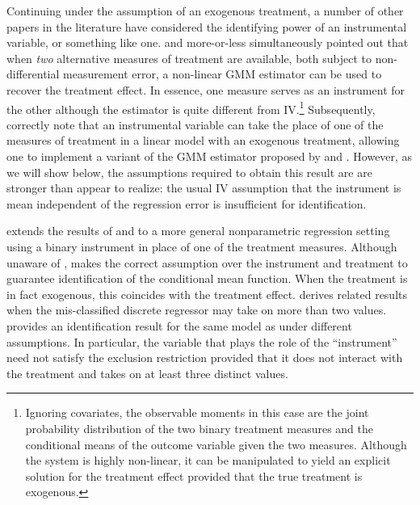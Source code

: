 Continuing under the assumption of an exogenous treatment, a number of other papers in the literature have considered the identifying power of an instrumental variable, or something like one.
\cite{BBS} and \cite{KRS} more-or-less simultaneously pointed out that when \emph{two} alternative measures of treatment are available, both subject to non-differential measurement error, a non-linear GMM estimator can be used to recover the treatment effect.
In essence, one measure serves as an instrument for the other although the estimator is quite different from IV.\footnote{Ignoring covariates, the observable moments in this case are the joint probability distribution of the two binary treatment measures and the conditional means of the outcome variable given the two measures. Although the system is highly non-linear, it can be manipulated to yield an explicit solution for the treatment effect provided that the true treatment is exogenous.}
Subsequently, \cite{FL} correctly note that an instrumental variable can take the place of one of the measures of treatment in a linear model with an exogenous treatment, allowing one to implement a variant of the GMM estimator proposed by \cite{BBS} and \cite{KRS}.
However, as we will show below, the assumptions required to obtain this result are are stronger than \cite{FL} appear to realize: the usual IV assumption that the instrument is mean independent of the regression error is insufficient for identification. 

\cite{Mahajan} extends the results of \cite{BBS} and \cite{KRS} to a more general nonparametric regression setting using a binary instrument in place of one of the treatment measures. 
Although unaware of \cite{FL}, \cite{Mahajan} makes the correct assumption over the instrument and treatment to guarantee identification of the conditional mean function.
When the treatment is in fact exogenous, this coincides with the treatment effect.
\cite{hu2008} derives related results when the mis-classified discrete regressor may take on more than two values.
\cite{Lewbel} provides an identification result for the same model as \cite{Mahajan} under different assumptions.
In particular, the variable that plays the role of the ``instrument'' need not satisfy the exclusion restriction provided that it does not interact with the treatment and takes on at least three distinct values. 

